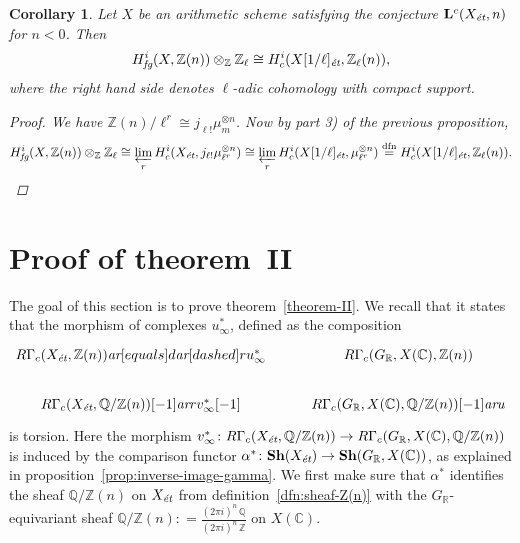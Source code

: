 \documentclass[leqno,12pt]{article}
\theoremstyle{plain}
\newtheorem{corollary}[theorem]{\indent\sc Corollary}
\theoremstyle{definition}
\newcommand{\CC}{\mathbb{C}}
\newcommand{\QQ}{\mathbb{Q}}
\newcommand{\RR}{\mathbb{R}}
\newcommand{\ZZ}{\mathbb{Z}}
\newcommand{\dfn}{\mathrel{\mathop:}=}
\newcommand{\ar}{\text{\it ar}}
\newcommand{\et}{\text{\it \'{e}t}}
\newcommand{\fg}{\text{\it fg}}
\begin{document}
\begin{corollary}
  \label{cor:RGamma-fg-model-for-l-adic-cohomology}
  Let $X$ be an arithmetic scheme satisfying the conjecture
  $\mathbf{L}^c (X_\et, n)$ for $n < 0$. Then
  $$H_\fg^i (X, \ZZ (n)) \otimes_\ZZ \ZZ_\ell \cong H^i_c (X [1/\ell]_\et, \ZZ_\ell (n)),$$
  where the right hand side denotes $\ell$-adic cohomology with compact support.

  \begin{proof}
    We have $\ZZ (n)/\ell^r \cong j_{\ell!} \mu_m^{\otimes n}$.
    Now by part 3) of the previous proposition,
    \[ H_\fg^i (X, \ZZ (n)) \otimes_\ZZ \ZZ_\ell \cong
      \varprojlim_r H_c^i (X_\et, j_{\ell!} \mu_{\ell^r}^{\otimes n}) \cong
      \varprojlim_r H_c^i (X [1/\ell]_\et, \mu_{\ell^r}^{\otimes n})
      \stackrel{\text{dfn}}{=} H_c^i (X [1/\ell]_\et, \ZZ_\ell (n)). \qedhere \]
  \end{proof}
\end{corollary}


\section{Proof of theorem~II}
\label{sec:theorem-II}

The goal of this section is to prove theorem~\ref{theorem-II}. We recall that it
states that the morphism of complexes $u_\infty^*$, defined as the composition
\[ \begin{tikzcd}
  R\Gamma_c (X_\et, \ZZ(n)) \ar[equals]{d}\ar[dashed]{r}{u_\infty^*} & R\Gamma_c (G_\RR, X (\CC), \ZZ (n)) \\
  R\Gamma_c (X_\et, \QQ/\ZZ (n)) [-1] \ar{r}{v_\infty^* [-1]} & R\Gamma_c (G_\RR, X (\CC), \QQ/\ZZ (n)) [-1] \ar{u}
\end{tikzcd} \]
is torsion. Here the morphism
$v_\infty^*\colon R\Gamma_c (X_\et, \QQ/\ZZ (n)) \to R\Gamma_c (G_\RR, X (\CC), \QQ/\ZZ (n))$
is induced by the comparison functor
$\alpha^*\colon \mathbf{Sh} (X_\et) \to \mathbf{Sh} (G_\RR, X (\CC))$, as
explained in proposition~\ref{prop:inverse-image-gamma}. We first make sure that
$\alpha^*$ identifies the sheaf $\QQ/\ZZ (n)$ on $X_\et$ from
definition~\ref{dfn:sheaf-Z(n)} with the $G_\RR$-equivariant sheaf
$\QQ/\ZZ (n) \dfn \frac{(2\pi i)^n\,\QQ}{(2\pi i)^n\,\ZZ}$ on $X (\CC)$.
\end{document}
